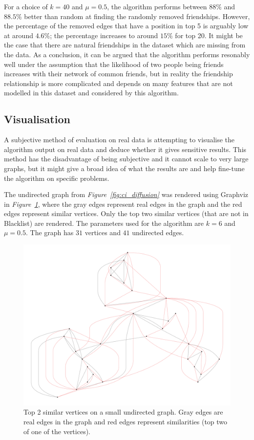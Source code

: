 \documentclass[12pt]{report}
\begin{document}
For a choice of $k=40$ and $\mu=0.5$, the algorithm performs between $88\%$ and
$88.5\%$ better than random at finding the randomly removed friendships. However,
the percentage of the removed edges that have a position in top 5 is arguably
low at around $4.6\%$; the percentage increases to around $15\%$ for top 20. It
might be the case that there are natural friendships in the dataset which are
missing from the data. As a conclusion, it can be argued that the algorithm
performs resonably well under the assumption that the likelihood of two people
being friends increases with their network of common friends, but in reality
the friendship relationship is more complicated and depends on many features
that are not modelled in this dataset and considered by this algorithm.



%
\subsection{Visualisation}
%
A subjective method of evaluation on real data is attempting to visualise the
algorithm output on real data and deduce whether it gives sensitive results.
This method has the disadvantage of being subjective and it cannot scale to very
large graphs, but it might give a broad idea of what the results are and help
fine-tune the algorithm on specific problems.

The undirected graph from \emph{Figure~\ref{fig:ci_diffusion}} was rendered
using Graphviz \cite{graphviz} in \emph{Figure~\ref{fig:visual_first}}, where the gray edges
represent real edges in the graph and the red edges represent similar vertices.
Only the top two similar vertices (that are not in Blacklist) are rendered. The
parameters used for the algorithm are $k=6$ and $\mu=0.5$. The graph has $31$
vertices and $41$ undirected edges.

\begin{figure}[tbp]
  \includegraphics[width=\textwidth]{visual_first}
  \caption{Top 2 similar vertices on a small undirected graph. Gray edges are
  real edges in the graph and red edges represent similarities (top two of one
  of the vertices).}
  \label{fig:visual_first}
\end{figure}
\end{document}
